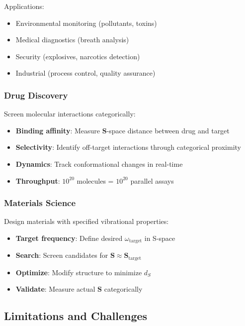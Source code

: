 Applications:
\begin{itemize}
\item Environmental monitoring (pollutants, toxins)
\item Medical diagnostics (breath analysis)
\item Security (explosives, narcotics detection)
\item Industrial (process control, quality assurance)
\end{itemize}

\subsubsection{Drug Discovery}

Screen molecular interactions categorically:

\begin{itemize}
\item \textbf{Binding affinity}: Measure $\mathbf{S}$-space distance between drug and target
\item \textbf{Selectivity}: Identify off-target interactions through categorical proximity
\item \textbf{Dynamics}: Track conformational changes in real-time
\item \textbf{Throughput}: $10^{20}$ molecules = $10^{20}$ parallel assays
\end{itemize}

\subsubsection{Materials Science}

Design materials with specified vibrational properties:

\begin{itemize}
\item \textbf{Target frequency}: Define desired $\omega_{\text{target}}$ in S-space
\item \textbf{Search}: Screen candidates for $\mathbf{S} \approx \mathbf{S}_{\text{target}}$
\item \textbf{Optimize}: Modify structure to minimize $d_S$
\item \textbf{Validate}: Measure actual $\mathbf{S}$ categorically
\end{itemize}

\subsection{Limitations and Challenges}

